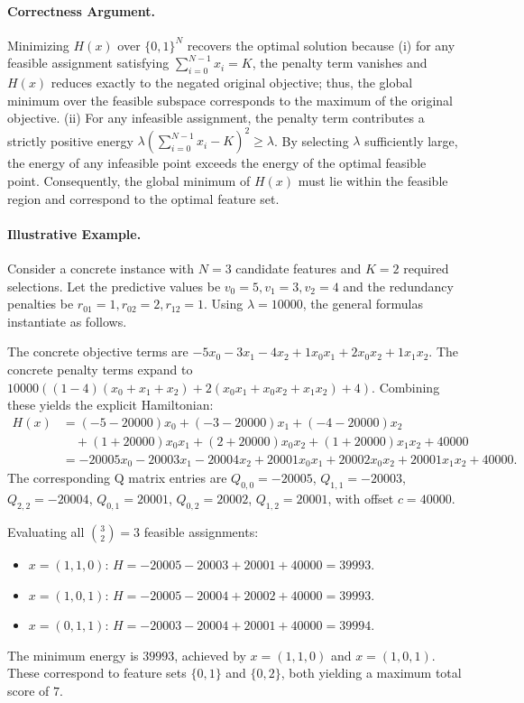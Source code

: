\documentclass[12pt]{article}
\begin{document}
\paragraph{Correctness Argument.}
Minimizing $H(x)$ over $\{0,1\}^N$ recovers the optimal solution because (i) for any feasible assignment satisfying $\sum_{i=0}^{N-1} x_i = K$, the penalty term vanishes and $H(x)$ reduces exactly to the negated original objective; thus, the global minimum over the feasible subspace corresponds to the maximum of the original objective. (ii) For any infeasible assignment, the penalty term contributes a strictly positive energy $\lambda (\sum_{i=0}^{N-1} x_i - K)^2 \geq \lambda$. By selecting $\lambda$ sufficiently large, the energy of any infeasible point exceeds the energy of the optimal feasible point. Consequently, the global minimum of $H(x)$ must lie within the feasible region and correspond to the optimal feature set.

\paragraph{Illustrative Example.}
Consider a concrete instance with $N=3$ candidate features and $K=2$ required selections. Let the predictive values be $v_0=5, v_1=3, v_2=4$ and the redundancy penalties be $r_{01}=1, r_{02}=2, r_{12}=1$. Using $\lambda=10000$, the general formulas instantiate as follows.

The concrete objective terms are $-5x_0 - 3x_1 - 4x_2 + 1x_0x_1 + 2x_0x_2 + 1x_1x_2$.
The concrete penalty terms expand to $10000 \left( (1-4)(x_0+x_1+x_2) + 2(x_0x_1+x_0x_2+x_1x_2) + 4 \right)$.
Combining these yields the explicit Hamiltonian:
\begin{align}
H(x) &= (-5 - 20000)x_0 + (-3 - 20000)x_1 + (-4 - 20000)x_2 \nonumber \\
&\quad + (1 + 20000)x_0x_1 + (2 + 20000)x_0x_2 + (1 + 20000)x_1x_2 + 40000 \nonumber \\
&= -20005x_0 - 20003x_1 - 20004x_2 + 20001x_0x_1 + 20002x_0x_2 + 20001x_1x_2 + 40000.
\end{align}
The corresponding Q matrix entries are $Q_{0,0}=-20005$, $Q_{1,1}=-20003$, $Q_{2,2}=-20004$, $Q_{0,1}=20001$, $Q_{0,2}=20002$, $Q_{1,2}=20001$, with offset $c=40000$.

Evaluating all $\binom{3}{2}=3$ feasible assignments:
\begin{itemize}
    \item $x=(1,1,0)$: $H = -20005 - 20003 + 20001 + 40000 = 39993$.
    \item $x=(1,0,1)$: $H = -20005 - 20004 + 20002 + 40000 = 39993$.
    \item $x=(0,1,1)$: $H = -20003 - 20004 + 20001 + 40000 = 39994$.
\end{itemize}
The minimum energy is $39993$, achieved by $x=(1,1,0)$ and $x=(1,0,1)$. These correspond to feature sets $\{0,1\}$ and $\{0,2\}$, both yielding a maximum total score of $7$.
\end{document}
